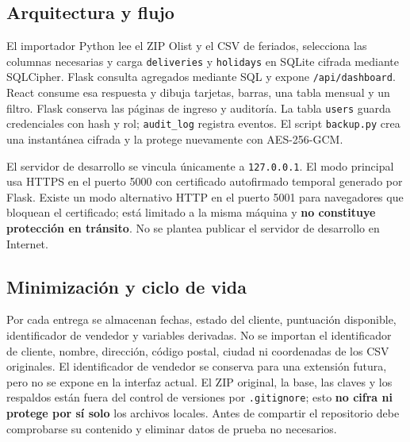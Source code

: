 \documentclass[12pt,a4paper]{article}
\begin{document}
\subsection{Arquitectura y flujo}
El importador Python lee el ZIP Olist y el CSV de feriados, selecciona las columnas necesarias y carga \texttt{deliveries} y \texttt{holidays} en SQLite cifrada mediante SQLCipher. Flask consulta agregados mediante SQL y expone \texttt{/api/dashboard}. React consume esa respuesta y dibuja tarjetas, barras, una tabla mensual y un filtro. Flask conserva las páginas de ingreso y auditoría. La tabla \texttt{users} guarda credenciales con hash y rol; \texttt{audit\_log} registra eventos. El script \texttt{backup.py} crea una instantánea cifrada y la protege nuevamente con AES-256-GCM.

\begin{center}
\end{center}

El servidor de desarrollo se vincula únicamente a \texttt{127.0.0.1}. El modo principal usa HTTPS en el puerto 5000 con certificado autofirmado temporal generado por Flask. Existe un modo alternativo HTTP en el puerto 5001 para navegadores que bloquean el certificado; está limitado a la misma máquina y \textbf{no constituye protección en tránsito}. No se plantea publicar el servidor de desarrollo en Internet.

\subsection{Minimización y ciclo de vida}
Por cada entrega se almacenan fechas, estado del cliente, puntuación disponible, identificador de vendedor y variables derivadas. No se importan el identificador de cliente, nombre, dirección, código postal, ciudad ni coordenadas de los CSV originales. El identificador de vendedor se conserva para una extensión futura, pero no se expone en la interfaz actual. El ZIP original, la base, las claves y los respaldos están fuera del control de versiones por \texttt{.gitignore}; esto \textbf{no cifra ni protege por sí solo} los archivos locales. Antes de compartir el repositorio debe comprobarse su contenido y eliminar datos de prueba no necesarios.
\end{document}
